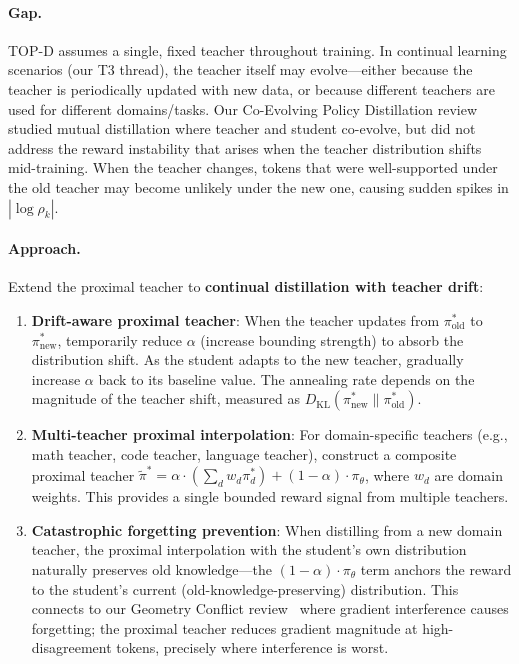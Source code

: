 \documentclass[11pt,a4paper]{article}
\begin{document}
\paragraph{Gap.} TOP-D assumes a single, fixed teacher throughout training. In continual learning scenarios (our T3 thread), the teacher itself may evolve---either because the teacher is periodically updated with new data, or because different teachers are used for different domains/tasks. Our Co-Evolving Policy Distillation review~\cite{coevolve2026} studied mutual distillation where teacher and student co-evolve, but did not address the reward instability that arises when the teacher distribution shifts mid-training. When the teacher changes, tokens that were well-supported under the old teacher may become unlikely under the new one, causing sudden spikes in $|\log \rho_k|$.

\paragraph{Approach.} Extend the proximal teacher to \textbf{continual distillation with teacher drift}:
\begin{enumerate}
\item \textbf{Drift-aware proximal teacher}: When the teacher updates from $\pi^*_{\mathrm{old}}$ to $\pi^*_{\mathrm{new}}$, temporarily reduce $\alpha$ (increase bounding strength) to absorb the distribution shift. As the student adapts to the new teacher, gradually increase $\alpha$ back to its baseline value. The annealing rate depends on the magnitude of the teacher shift, measured as $D_{\mathrm{KL}}(\pi^*_{\mathrm{new}} \| \pi^*_{\mathrm{old}})$.
\item \textbf{Multi-teacher proximal interpolation}: For domain-specific teachers (e.g., math teacher, code teacher, language teacher), construct a composite proximal teacher $\tilde{\pi}^* = \alpha \cdot (\sum_d w_d \pi^*_d) + (1 - \alpha) \cdot \pi_\theta$, where $w_d$ are domain weights. This provides a single bounded reward signal from multiple teachers.
\item \textbf{Catastrophic forgetting prevention}: When distilling from a new domain teacher, the proximal interpolation with the student's own distribution naturally preserves old knowledge---the $(1 - \alpha) \cdot \pi_\theta$ term anchors the reward to the student's current (old-knowledge-preserving) distribution. This connects to our Geometry Conflict review~\cite{geomconflict2026} where gradient interference causes forgetting; the proximal teacher reduces gradient magnitude at high-disagreement tokens, precisely where interference is worst.
\end{enumerate}
\end{document}
